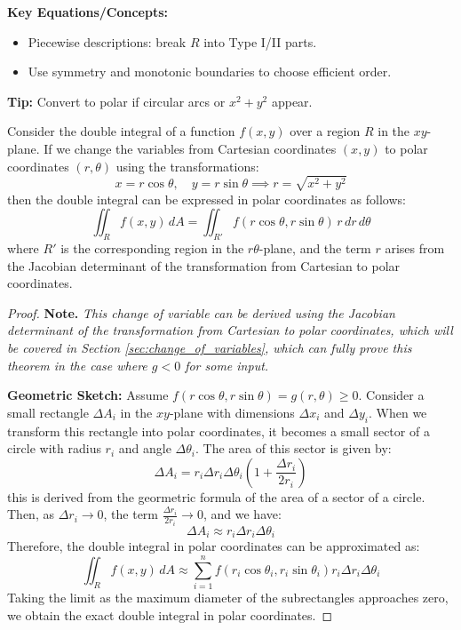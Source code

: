 \documentclass[11pt]{report}
\begin{document}
\begin{keybox}
	\textbf{Key Equations/Concepts:}
\begin{itemize}
    \item Piecewise descriptions: break $R$ into Type I/II parts.
    \item Use symmetry and monotonic boundaries to choose efficient order.
\end{itemize}
	\textbf{Tip:} Convert to polar if circular arcs or $x^2{+}y^2$ appear.
\end{keybox}

\begin{theorem}
    Consider the double integral of a function $f(x,y)$ over a region $R$ in the $xy$-plane. If we change the variables from Cartesian coordinates $(x,y)$ to polar coordinates $(r,\theta)$ using the transformations:
    $$
        x = r \cos{\theta}, \quad y = r \sin{\theta} \implies r = \sqrt{x^2 + y^2}
    $$
    then the double integral can be expressed in polar coordinates as follows:
    \begin{equation}
        \iint_R f(x,y) \, dA = \iint_{R'} f(r \cos{\theta}, r \sin{\theta}) \, r \, dr \, d\theta
    \end{equation}
    where $R'$ is the corresponding region in the $r\theta$-plane, and the term $r$ arises from the Jacobian determinant of the transformation from Cartesian to polar coordinates.
\end{theorem}
\begin{proof}
   \textbf{Note. } \textit{This change of variable can be derived using the Jacobian determinant of the transformation from Cartesian to polar coordinates, which will be covered in Section \ref{sec:change_of_variables}, which can fully prove this theorem in the case where $g < 0$ for some input.}

   \textbf{Geometric Sketch: } Assume $f(r \cos{\theta}, r \sin{\theta}) = g(r, \theta) \ge 0$. Consider a small rectangle $\Delta A_i$ in the $xy$-plane with dimensions $\Delta x_i$ and $\Delta y_i$. When we transform this rectangle into polar coordinates, it becomes a small sector of a circle with radius $r_i$ and angle $\Delta \theta_i$. The area of this sector is given by:
    $$
          \Delta A_i = r_i \Delta r_i \Delta \theta_i  \left( 1 + \frac{\Delta r_i}{2r_i} \right)
    $$
    this is derived from the geormetric formula of the area of a sector of a circle. Then, as $\Delta r_i \to 0$, the term $\frac{\Delta r_i}{2r_i} \to 0$, and we have:
    $$
        \Delta A_i \approx r_i \Delta r_i \Delta \theta_i
    $$
    Therefore, the double integral in polar coordinates can be approximated as:
    $$
        \iint_R f(x,y) \, dA \approx \sum_{i=1}^n f(r_i \cos{\theta_i}, r_i \sin{\theta_i}) r_i \Delta r_i \Delta \theta_i
    $$
    Taking the limit as the maximum diameter of the subrectangles approaches zero, we obtain the exact double integral in polar coordinates.
\end{proof}
\end{document}
